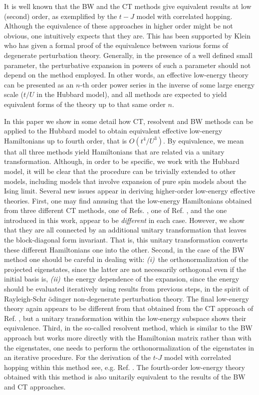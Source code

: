 \documentclass[floatfix,twocolumn,aps,prb,showpacs,superscriptaddress]{revtex4}
\begin{document}
It is well known that the BW and the CT methods give equivalent results at
low (second) order, as exemplified by the $t-J$ model with correlated
hopping. Although the
equivalence of these approaches in higher order might be not obvious, one
intuitively expects that they are. This has been supported by Klein
\cite{Klein:1974} 
who has given a formal proof of the equivalence between various forms of
degenerate perturbation theory. Generally, in the presence of a well defined
small parameter, the perturbative expansion in powers of such a parameter
should not depend on the method employed. In other words, an effective
low-energy theory can be presented as an $n$-th order power series in the
inverse of some large energy scale ($t/U$ in the Hubbard model), and all
methods are expected to yield equivalent forms of the theory up to that same
order $n$.


In this paper we show in some detail how CT, resolvent and BW methods can be
applied to the Hubbard model to obtain equivalent effective
low-energy Hamiltonians up to fourth order, that is $O(t^{4}/U^{3})$.  By equivalence, we mean that all three methods yield Hamiltonians that are related via a unitary transformation.  Although,
in order to be specific, we work with the Hubbard model, it will be clear
that the procedure can be trivially extended to other models, including
models that involve expansion of pure spin models about the Ising limit.
\cite{Lannert} Several new issues appear in deriving higher-order low-energy
effective theories. First, one may find amusing that the low-energy
Hamiltonians obtained from three different CT methods, one of
Refs. , one of
Ref. , and the one introduced in this work, appear
to be \textit{different} in each case. However, we show that they are all
connected by an additional unitary transformation that leaves the
block-diagonal form invariant.\cite{Stein} That is, this unitary
transformation converts these different Hamiltonians one into the
other. Second, 
in the case of the BW method one should be careful in dealing with: \textit{%
(i)}\ the orthonormalization of the projected eigenstates, since the latter
are not necessarily orthogonal even if the initial basis is, \textit{(ii)}\
the energy dependence of the expansion, since the energy should be evaluated
iteratively using results from previous steps, in the spirit of Rayleigh-Schr%
\"{o}dinger non-degenerate perturbation theory. The final low-energy theory
again appears to be different from that obtained from the CT approach
of Ref. \onlinecite{Girvin:1989},
but a unitary transformation within the low-energy subspace shows their
equivalence. Third, in the so-called resolvent method, which is similar to the
BW approach but works more directly with the Hamiltonian matrix rather than
with the eigenstates, one needs to perform the orthonormalization of
the eigenstates in an iterative
procedure. For the  derivation of the $t$-$J$ model  with correlated
hopping within this method see, e.g. 
Ref. . The fourth-order low-energy theory obtained with
this method is also unitarily equivalent to the results of the BW and CT
approaches.
\end{document}
